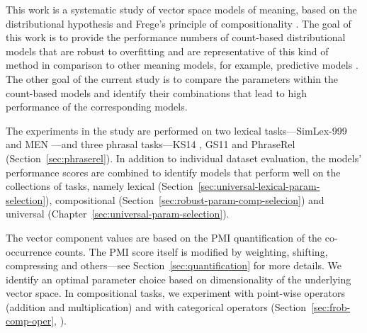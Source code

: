 \documentclass[11pt,a4paper,english,oneside]{book}
\newcommand\newcite\citet
\renewcommand\cite\citep
\begin{document}
This work is a systematic study of vector space models of meaning, based on the distributional hypothesis \cite{harris1954distributional} and Frege's principle of compositionality \cite{Janssen2001,DBLP:journals/corr/abs-1003-4394}. The goal of this work is to provide the performance numbers of count-based distributional models that are robust to overfitting and are representative of this kind of method in comparison to other meaning models, for example, predictive models \cite{mikolov2013efficient}. The other goal of the current study is to compare the parameters within the count-based models and identify their combinations that lead to high performance of the corresponding models.

The experiments in the study are performed on two lexical tasks---SimLex-999 \cite{hill2014simlex} and MEN \cite{Bruni:2014:MDS:2655713.2655714}---and three phrasal tasks---KS14 \cite{kartsadrqpl2014}, GS11 \cite{Grefenstette:2011:ETV:2140490.2140497} and PhraseRel (Section~\ref{sec:phraserel}). In addition to individual dataset evaluation, the models' performance scores are combined to identify models that perform well on the collections of tasks, namely lexical (Section~\ref{sec:universal-lexical-param-selection}), compositional (Section~\ref{sec:robust-param-comp-selecion}) and universal (Chapter~\ref{sec:universal-param-selection}).

The vector component values are based on the PMI quantification of the co-occurrence counts. The PMI score itself is modified by weighting, shifting, compressing and others---see Section~\ref{sec:quantification} for more details. We identify an optimal parameter choice based on dimensionality of the underlying vector space. In compositional tasks, we experiment with point-wise operators (addition and multiplication) and with categorical operators (Section~\ref{sec:frob-comp-oper}, \newcite{DBLP:journals/corr/abs-1003-4394}).
\end{document}
